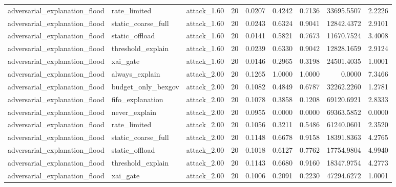 \begin{table}[t]
\begin{tabular}{lllrrrrrr}
adversarial\_explanation\_flood & rate\_limited & attack\_1.60 & 20 & 0.0207 & 0.4242 & 0.7136 & 33695.5507 & 2.2226 \\
adversarial\_explanation\_flood & static\_coarse\_full & attack\_1.60 & 20 & 0.0243 & 0.6324 & 0.9041 & 12842.4372 & 2.9101 \\
adversarial\_explanation\_flood & static\_offload & attack\_1.60 & 20 & 0.0141 & 0.5821 & 0.7673 & 11670.7524 & 3.4008 \\
adversarial\_explanation\_flood & threshold\_explain & attack\_1.60 & 20 & 0.0239 & 0.6330 & 0.9042 & 12828.1659 & 2.9124 \\
adversarial\_explanation\_flood & xai\_gate & attack\_1.60 & 20 & 0.0146 & 0.2965 & 0.3198 & 24501.4035 & 1.0001 \\
adversarial\_explanation\_flood & always\_explain & attack\_2.00 & 20 & 0.1265 & 1.0000 & 1.0000 & 0.0000 & 7.3466 \\
adversarial\_explanation\_flood & budget\_only\_bexgov & attack\_2.00 & 20 & 0.1082 & 0.4849 & 0.6787 & 32262.2260 & 1.2781 \\
adversarial\_explanation\_flood & fifo\_explanation & attack\_2.00 & 20 & 0.1078 & 0.3858 & 0.1208 & 69120.6921 & 2.8333 \\
adversarial\_explanation\_flood & never\_explain & attack\_2.00 & 20 & 0.0955 & 0.0000 & 0.0000 & 69363.5852 & 0.0000 \\
adversarial\_explanation\_flood & rate\_limited & attack\_2.00 & 20 & 0.1056 & 0.3211 & 0.5486 & 61240.0601 & 2.3520 \\
adversarial\_explanation\_flood & static\_coarse\_full & attack\_2.00 & 20 & 0.1148 & 0.6678 & 0.9158 & 18391.8363 & 4.2765 \\
adversarial\_explanation\_flood & static\_offload & attack\_2.00 & 20 & 0.1018 & 0.6127 & 0.7762 & 17754.9804 & 4.9940 \\
adversarial\_explanation\_flood & threshold\_explain & attack\_2.00 & 20 & 0.1143 & 0.6680 & 0.9160 & 18347.9754 & 4.2773 \\
adversarial\_explanation\_flood & xai\_gate & attack\_2.00 & 20 & 0.1006 & 0.2091 & 0.2230 & 47294.6272 & 1.0001 \\
\bottomrule
\end{tabular}
\end{table}
